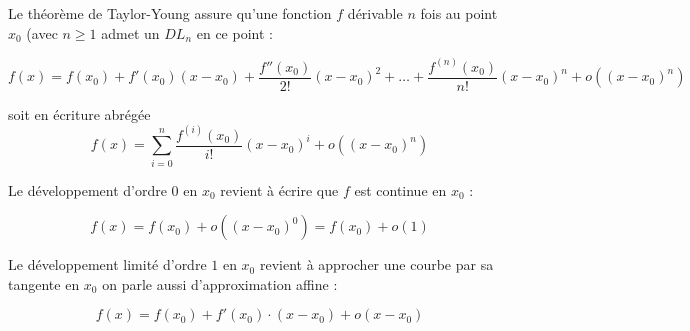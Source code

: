 Le théorème de Taylor-Young assure \cite{coulombeau2013math} qu'une fonction $f$ dérivable $n$ fois au point $x_0$ (avec ${\displaystyle n\geq 1}$ admet un $DL_n$ en ce point :

$$
{\displaystyle f(x)=f(x_{0})+f'(x_{0})(x-x_{0})+{\frac {f''(x_{0})}{2!}}(x-x_{0})^{2}+\dots +{\frac {f^{(n)}(x_{0})}{n!}}(x-x_{0})^{n}+o((x-x_{0})^{n})}
$$

soit en écriture abrégée
$$
f(x)=\sum _{{i=0}}^{n}{\frac  {f^{{(i)}}(x_{0})}{i!}}(x-x_{0})^{i}+o((x-x_{0})^{n})
$$

Le développement d'ordre $0$ en $x_0$ revient à écrire que $f$ est continue en $x_0$ :

$$
{\displaystyle f(x)=f(x_{0})+o((x-x_{0})^{0})=f(x_{0})+o(1)}
$$

Le développement limité d'ordre $1$  en $x_0$ revient à approcher une courbe par sa tangente en $x_0$ on parle aussi d'approximation affine :

\begin{equation}\label{eq:dev_lim_cont}
f(x)=f(x_{0})+f'(x_{0})\cdot (x-x_{0})+o(x-x_{0})
\end{equation}












